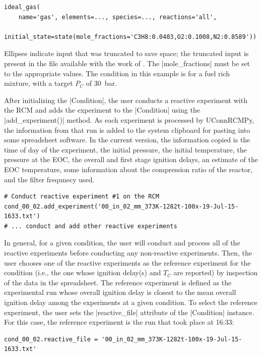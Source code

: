 \documentclass[12pt]{../ussci}
\begin{document}
\begin{verbatim}
ideal_gas(
    name='gas', elements=..., species=..., reactions='all',
    initial_state=state(mole_fractions='C3H8:0.0403,O2:0.1008,N2:0.8589'))
\end{verbatim}

Ellipses indicate input that was truncated to save space; the truncated input is
present in the file available with the work of \textcite{Dames2016}. The
\python|mole_fractions| must be set to the appropriate values. The condition in
this example is for a fuel rich mixture, with a target \(P_C\) of \SI{30}{\bar}.

After initializing the \python|Condition|, the user conducts a reactive
experiment with the RCM and adds the experiment to the \python|Condition| using
the \python|add_experiment()| method. As each experiment is processed by
UConnRCMPy, the information from that run is added to the system clipboard for
pasting into some spreadsheet software. In the current version, the information
copied is the time of day of the experiment, the initial pressure, the initial
temperature, the pressure at the EOC, the overall and first stage ignition
delays, an estimate of the EOC temperature, some information about the
compression ratio of the reactor, and the filter frequnecy used.

\begin{verbatim}
# Conduct reactive experiment #1 on the RCM
cond_00_02.add_experiment('00_in_02_mm_373K-1282t-100x-19-Jul-15-1633.txt')
# ... conduct and add other reactive experiments
\end{verbatim}

In general, for a given condition, the user will conduct and process all of the
reactive experiments before conducting any non-reactive experiments. Then, the
user chooses one of the reactive experiments as the reference experiment for the
condition (i.e., the one whose ignition delay(s) and \(T_C\) are reported) by
inspection of the data in the spreadsheet. The reference experiment is defined
as the experimental run whose overall ignition delay is closest to the mean
overall ignition delay among the experiments at a given condition. To select the
reference experiment, the user sets the \python|reactive_file| attribute of the
\python|Condition| instance. For this case, the reference experiment is the run
that took place at 16:33:

\begin{verbatim}
cond_00_02.reactive_file = '00_in_02_mm_373K-1282t-100x-19-Jul-15-1633.txt'
\end{verbatim}
\end{document}

